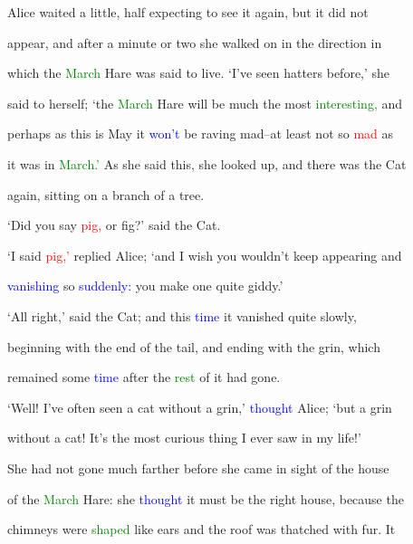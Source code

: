  Alice \textcolor{BurntOrange}{waited} a little, half \textcolor{BurntOrange}{expecting} to see it again, but it did not

 appear, and after a minute or two she walked on in the direction in

 which the \textcolor{green}{March} Hare was said to live. ‘I’ve seen hatters before,’ she

 said to herself; ‘the \textcolor{green}{March} Hare will be much the most \textcolor{green}{interesting,} and

 perhaps as this is May it \textcolor{blue}{won’t} be \textcolor{BurntOrange}{raving} mad--at least not so \textcolor{red}{mad} as

 it was in \textcolor{green}{March.’} As she said this, she looked up, and there was the Cat

 again, sitting on a branch of a \textcolor{BurntOrange}{tree.}



 ‘Did you say \textcolor{red}{pig,} or fig?’ said the Cat.



 ‘I said \textcolor{red}{pig,’} replied Alice; ‘and I wish you wouldn’t keep appearing and

 \textcolor{blue}{vanishing} so \textcolor{blue}{suddenly:} you make one quite giddy.’



 ‘All right,’ said the Cat; and this \textcolor{blue}{time} it \textcolor{BurntOrange}{vanished} quite slowly,

 beginning with the end of the tail, and ending with the \textcolor{BurntOrange}{grin,} which

 remained some \textcolor{blue}{time} after the \textcolor{green}{rest} of it had gone.



 ‘Well! I’ve often seen a cat without a \textcolor{BurntOrange}{grin,’} \textcolor{blue}{thought} Alice; ‘but a \textcolor{BurntOrange}{grin}

 without a cat! It’s the most curious thing I ever saw in my life!’



 She had not gone much farther before she came in sight of the house

 of the \textcolor{green}{March} Hare: she \textcolor{blue}{thought} it must be the right house, because the

 chimneys were \textcolor{green}{shaped} like ears and the roof was thatched with fur. It

